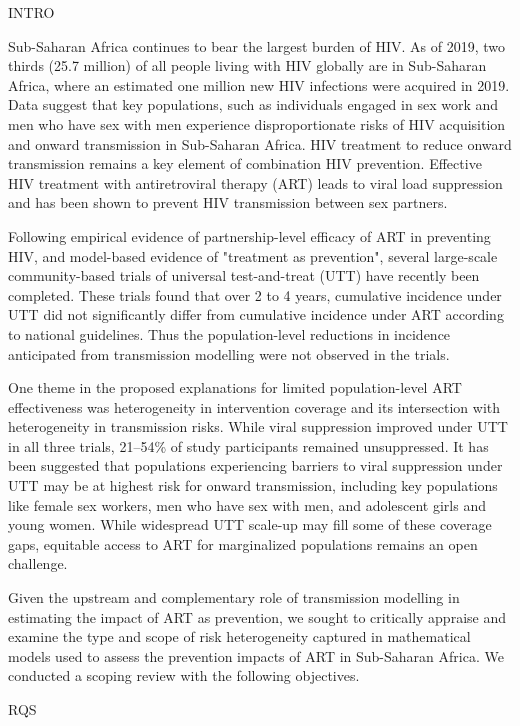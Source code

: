 

INTRO

Sub-Saharan Africa continues to bear the largest burden of HIV.
As of 2019, two thirds (25.7 million) of all people living with HIV globally are in Sub-Saharan Africa, where
an estimated one million new HIV infections were acquired in 2019.
Data suggest that key populations, such as individuals engaged in sex work and men who have sex with men experience
disproportionate risks of HIV acquisition and onward transmission in Sub-Saharan Africa.
HIV treatment to reduce onward transmission remains a key element of combination HIV prevention.
Effective HIV treatment with antiretroviral therapy (ART) leads to viral load suppression
and has been shown to prevent HIV transmission between sex partners.

Following empirical evidence of partnership-level efficacy of ART
in preventing HIV,
and model-based evidence of "treatment as prevention",
several large-scale community-based trials of universal test-and-treat (UTT)
have recently been completed.
These trials found that over 2 to 4 years,
cumulative incidence under UTT did not significantly differ from
cumulative incidence under ART according to national guidelines.
Thus the population-level reductions in incidence anticipated from transmission modelling
were not observed in the trials.

One theme in the proposed explanations for limited population-level ART effectiveness
was heterogeneity in intervention coverage and its intersection with
heterogeneity in transmission risks.
While viral suppression improved under UTT in all three trials,
21--54\% of study participants remained unsuppressed.
It has been suggested that populations experiencing barriers to viral suppression under UTT
may be at highest risk for onward transmission, including key populations like
female sex workers, men who have sex with men, and adolescent girls and young women.
While widespread UTT scale-up may fill some of these coverage gaps,
equitable access to ART for marginalized populations remains an open challenge.

Given the upstream and complementary role of transmission modelling
in estimating the impact of ART as prevention,
we sought to critically appraise and examine the type and scope of risk heterogeneity captured
in mathematical models used to assess the prevention impacts of ART in Sub-Saharan Africa.
We conducted a scoping review with the following objectives.

RQS

